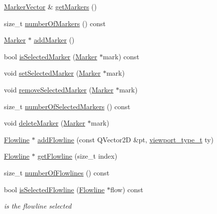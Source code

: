 \begin{DoxyCompactItemize}
\item 
\hyperlink{namespaceShipCAD_a36fff5b53986f6d6976afc749463ef22}{Marker\+Vector} \& \hyperlink{classShipCAD_1_1ShipCADModel_abc5faaa00b4b34bc1b0b1cd52af4ab3b}{get\+Markers} ()
\item 
size\+\_\+t \hyperlink{classShipCAD_1_1ShipCADModel_a6feda4dd07262d1f137f8f8a677bd23d}{number\+Of\+Markers} () const 
\item 
\hyperlink{classShipCAD_1_1Marker}{Marker} $\ast$ \hyperlink{classShipCAD_1_1ShipCADModel_ac7fd2d6607f589a20444f3efb8fde63b}{add\+Marker} ()
\item 
bool \hyperlink{classShipCAD_1_1ShipCADModel_ac7aabd58923105ec36b27d44d747aa42}{is\+Selected\+Marker} (\hyperlink{classShipCAD_1_1Marker}{Marker} $\ast$mark) const 
\item 
void \hyperlink{classShipCAD_1_1ShipCADModel_afd7e984f4070d08cb16264c1b731580f}{set\+Selected\+Marker} (\hyperlink{classShipCAD_1_1Marker}{Marker} $\ast$mark)
\item 
void \hyperlink{classShipCAD_1_1ShipCADModel_a7fb06b0a1fa75ef02597752fc3f691a2}{remove\+Selected\+Marker} (\hyperlink{classShipCAD_1_1Marker}{Marker} $\ast$mark)
\item 
size\+\_\+t \hyperlink{classShipCAD_1_1ShipCADModel_a3138ff1240e6ccc1e9072c066a0ffedf}{number\+Of\+Selected\+Markers} () const 
\item 
void \hyperlink{classShipCAD_1_1ShipCADModel_a2e6888d7b5e8d6346286d0262a93a183}{delete\+Marker} (\hyperlink{classShipCAD_1_1Marker}{Marker} $\ast$mark)
\item 
\hyperlink{classShipCAD_1_1Flowline}{Flowline} $\ast$ \hyperlink{classShipCAD_1_1ShipCADModel_a73494d53c57b4401f59f3feb3d73941b}{add\+Flowline} (const Q\+Vector2D \&pt, \hyperlink{namespaceShipCAD_aeeeb05810f2e31ef89fd4ac6b6ba9c0a}{viewport\+\_\+type\+\_\+t} ty)
\item 
\hyperlink{classShipCAD_1_1Flowline}{Flowline} $\ast$ \hyperlink{classShipCAD_1_1ShipCADModel_afc5654f671a17dd6672230648842975e}{get\+Flowline} (size\+\_\+t index)
\item 
size\+\_\+t \hyperlink{classShipCAD_1_1ShipCADModel_a7bb6418bfa20645211e6bdbf8c6ef951}{number\+Of\+Flowlines} () const 
\item 
bool \hyperlink{classShipCAD_1_1ShipCADModel_afcac043bc1d1c627e95ca1bc4aa0174e}{is\+Selected\+Flowline} (\hyperlink{classShipCAD_1_1Flowline}{Flowline} $\ast$flow) const 
\begin{DoxyCompactList}\small\item\em is the flowline selected \end{DoxyCompactList}\item 

\end{DoxyCompactItemize}
